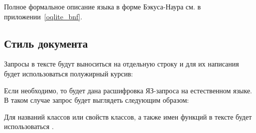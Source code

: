 
Полное формальное описание языка в форме Бэкуса-Наура см. в приложении~\ref{oqlite_bnf}.




\subsection{Стиль документа}
Запросы в тексте будут выноситься на отдельную строку и для их написания
будет использоваться полужирный курсив: 

Если необходимо, то будет дана расшифровка ЯЗ-запроса на естественном языке. В таком случае
запрос будет выглядеть следующим образом:

Для названий классов или свойств классов, а также имен функций в тексте будет использоваться
.
